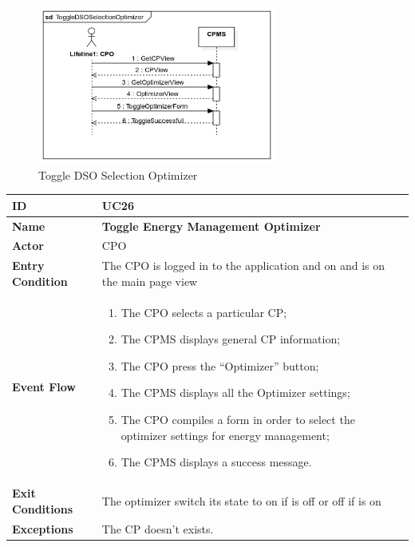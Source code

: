 \documentclass{Configuration_Files/PoliMi3i_thesis}
\begin{document}
\begin{figure}[H]
    \centering
    \includegraphics[width=0.7\textwidth]{Images/UseCases/ToggleDSOSelectionOptimizer.jpg}
    \caption{Toggle DSO Selection Optimizer}
\end{figure}


\begin{table}[H]
    \begin{xltabular}{\textwidth}{| >{}l | X |}
    \hline
    \textbf{ID} & \textbf{UC26}\T\B\\
    \hline
    \textbf{Name} & \textbf{Toggle Energy Management Optimizer}\T\B\\
    \hline \hline
    \textbf{Actor} & CPO\T\B \\
    \hline
    \textbf{Entry Condition} & The CPO is logged in to the application and on and is on the main page view\T\B\\
    \hline
    \textbf{Event Flow} & 
        \begin{enumerate}
        \item The CPO selects a particular CP;
        \item The CPMS displays general CP information;
        \item The CPO press the “Optimizer” button;
        \item The CPMS displays all the Optimizer settings;
        \item The CPO compiles a form in order to select the optimizer settings for energy management;
        \item The CPMS displays a success message.
        \end{enumerate}\B\\
    \hline
    \textbf{Exit Conditions} & The optimizer switch its state to on if is off or off if is on \B\\
    \hline
    \textbf{Exceptions} & 
        The CP doesn't exists.\B\\
    \hline
    \end{xltabular}
\end{table}
\end{document}

